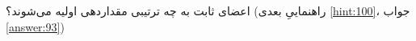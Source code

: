 \section{}
\paragraph{}\label{hint:210}
اعضای ثابت به چه ترتیبی مقداردهی اولیه می‌شوند؟ (راهنماییِ بعدی \ref{hint:100}، جواب \ref{answer:93})